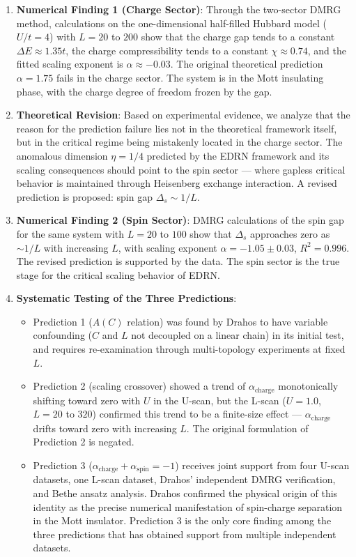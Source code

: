 \documentclass[prb,reprint,twocolumn,superscriptaddress]{revtex4-2}
\begin{document}
\begin{enumerate}
\item \textbf{Numerical Finding 1 (Charge Sector)}: Through the two-sector DMRG method, calculations on the one-dimensional half-filled Hubbard model ($U/t = 4$) with $L = 20$ to $200$ show that the charge gap tends to a constant $\Delta E \approx 1.35t$, the charge compressibility tends to a constant $\chi \approx 0.74$, and the fitted scaling exponent is $\alpha \approx -0.03$. The original theoretical prediction $\alpha = 1.75$ fails in the charge sector. The system is in the Mott insulating phase, with the charge degree of freedom frozen by the gap.
\item \textbf{Theoretical Revision}: Based on experimental evidence, we analyze that the reason for the prediction failure lies not in the theoretical framework itself, but in the critical regime being mistakenly located in the charge sector. The anomalous dimension $\eta = 1/4$ predicted by the EDRN framework and its scaling consequences should point to the spin sector --- where gapless critical behavior is maintained through Heisenberg exchange interaction. A revised prediction is proposed: spin gap $\Delta_s \sim 1/L$.
\item \textbf{Numerical Finding 2 (Spin Sector)}: DMRG calculations of the spin gap for the same system with $L = 20$ to $100$ show that $\Delta_s$ approaches zero as $\sim 1/L$ with increasing $L$, with scaling exponent $\alpha = -1.05 \pm 0.03$, $R^2 = 0.996$. The revised prediction is supported by the data. The spin sector is the true stage for the critical scaling behavior of EDRN.
\item \textbf{Systematic Testing of the Three Predictions}:
   \begin{itemize}
   \item Prediction 1 ($A(C)$ relation) was found by Drahos to have variable confounding ($C$ and $L$ not decoupled on a linear chain) in its initial test, and requires re-examination through multi-topology experiments at fixed $L$.
   \item Prediction 2 (scaling crossover) showed a trend of $\alpha_{\mathrm{charge}}$ monotonically shifting toward zero with $U$ in the U-scan, but the L-scan ($U = 1.0$, $L = 20$ to $320$) confirmed this trend to be a finite-size effect --- $\alpha_{\mathrm{charge}}$ drifts toward zero with increasing $L$. The original formulation of Prediction 2 is negated.
   \item Prediction 3 ($\alpha_{\mathrm{charge}} + \alpha_{\mathrm{spin}} = -1$) receives joint support from four U-scan datasets, one L-scan dataset, Drahos' independent DMRG verification, and Bethe ansatz analysis. Drahos confirmed the physical origin of this identity as the precise numerical manifestation of spin-charge separation in the Mott insulator. Prediction 3 is the only core finding among the three predictions that has obtained support from multiple independent datasets.

\end{itemize}
\end{enumerate}
\end{document}
